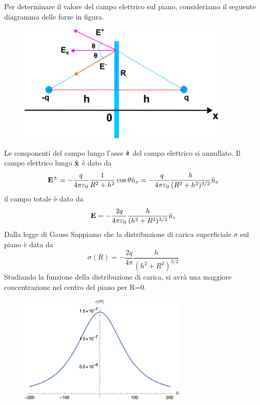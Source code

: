 Per determinare il valore del campo elettrico sul piano, consideriamo il seguente diagramma delle forze in figura.
\begin{figure}[!ht]
\vspace{0.1in}
\includegraphics[width = 10cm]{images/planechargestudy}
\centering
\vspace{0.1in}
\end{figure}

Le componenti del campo lungo l'asse $\hat{\bold{z}}$ del campo elettrico si annullato. Il campo elettrico lungo $\hat{\bold{x}}$ \`e dato da 
\begin{equation*}
	\bold{E}^{\pm} = -\frac{q}{4\pi \varepsilon_0}\frac{1}{R^2+h^2}\cos \theta \hat{u}_{x} = -\frac{q}{4\pi \varepsilon_0}\frac{h}{(R^2+h^2)^{3/2}} \hat{u}_{x}
\end{equation*}
il campo totale \`e dato da 
\begin{equation*}
	\bold{E} = -\frac{2q}{4 \pi \varepsilon_0} \frac{h}{(h^2 + R^2)^{3/2}} \hat{u}_{z}
\end{equation*}
Dalla legge di Gauss Sappiamo che la distribuzione di carica superficiale $\sigma$ sul piano \`e data da 
\begin{equation*}
	\sigma(R) = - \frac{2q}{4 \pi} \frac{h}{(h^2 + R^2)^{3/2}}
\end{equation*}
Studiando la funzione della distribuzione di carica, si avr\`a una maggiore concentrazione nel centro del piano per R=0.
\begin{figure}[!ht]
\vspace{0.1in}
\includegraphics[width = 8cm]{images/planechagedist}
\centering
\vspace{0.1in}
\end{figure}

